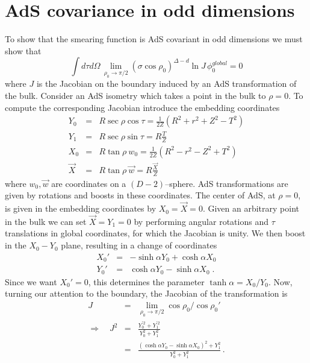 \documentclass[12pt]{article}
\begin{document}
\section{AdS covariance in odd dimensions} \label{covariance}

To show that the smearing function is AdS covariant in odd dimensions
we must show that
\begin{equation}
\label{CovarianceIdentity}
\int d\tau d \Omega \, \lim_{\rho_0 \rightarrow \pi/2}
(\sigma \cos \rho_0)^{\Delta - d} \ln J \, \phi_0^{global} = 0
\end{equation}
where $J$ is the Jacobian on the boundary induced by an AdS
transformation of the bulk.  Consider an AdS isometry which takes a
point in the bulk to $\rho = 0$.  To compute the corresponding
Jacobian introduce the embedding coordinates
\begin{eqnarray}
Y_0 &=& R \sec \rho \cos \tau = \frac{1}{2Z} (R^2 + r^2 + Z^2 - T^2) \label{embed_1}\\
Y_1 &=& R \sec \rho \sin \tau = R \frac{T}{Z} \\
X_0 &=& R \tan \rho\  w_0 = \frac{1}{2Z} (R^2 - r^2 - Z^2 + T^2) \\
\vec{X} &=& R \tan \rho \ \vec{w} = R \frac{\vec{X}}{Z} \label{embed_4}
\end{eqnarray}
where $w_0, \vec{w}$ are coordinates on a $(D-2)$--sphere.  AdS
transformations are given by rotations and boosts in these
coordinates.  The center of AdS, at $\rho=0$, is given in the
embedding coordinates by $X_0=\vec{X}=0$.  Given an arbitrary point in
the bulk we can set $\vec{X} = Y_1 = 0$ by performing angular
rotations and $\tau$ translations in global coordinates, for which the
Jacobian is unity.  We then boost in the $X_0-Y_0$ plane, resulting in a
change of coordinates
\begin{eqnarray*}
X_0' &=& -\sinh \alpha Y_0 + \cosh \alpha X_0 \\
Y_0' &=& \cosh \alpha Y_0 - \sinh \alpha X_0 \;.
\end{eqnarray*}
Since we want $X_0'=0$, this determines the parameter $\tanh \alpha =
X_0/Y_0$.  Now, turning our attention to the boundary, the Jacobian of
the transformation is
\begin{eqnarray}
\nonumber
J & = &\lim_{\rho_0 \to \pi/2} \cos \rho_0 / \cos \rho_0' \\
\Rightarrow \quad J^2 & = & \frac{Y_0^{'2} + Y_1^{'2}}{Y_0^2 + Y_1^2} \\
\nonumber
& = & \frac{(\cosh \alpha Y_0 - \sinh \alpha X_0)^2 + Y_1^2}{Y_0^2 + Y_1^2}\,.
\end{eqnarray}
\end{document}
